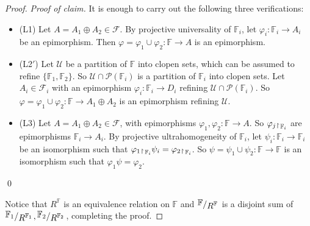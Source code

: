 \documentclass[12pt,twoside,a4paper]{amsart}
\theoremstyle{plain}
\theoremstyle{definition}
\begin{document}
\begin{proof}
{\it Proof of claim.}
It is enough to carry out the following three verifications:
\begin{itemize}
\item (L1) Let $A=A_1\oplus A_2\in \mathcal F $.
By projective universality of $ \mathbb F_i$, let $ {\varphi}_i: \mathbb F_i\to A_i$ be an epimorphism.
Then $ {\varphi} = {\varphi}_1\cup {\varphi}_2: \mathbb F \to A$ is an epimorphism.
\item (L2$'$) Let $ \mathcal U $ be a partition of $ \mathbb F $ into clopen sets, which can be assumed to refine $\{ \mathbb F_1, \mathbb F_2\} $.
So $ \mathcal U \cap \mathcal P ( \mathbb F_i)$ is a partition of $ \mathbb F_i$ into clopen sets.
Let $A_i\in \mathcal F_i$ with an epimorphism $ {\varphi}_i: \mathbb F_i\to D_i$ refining $ \mathcal U \cap \mathcal P ( \mathbb F_i)$.
So $ {\varphi} = {\varphi}_1\cup {\varphi}_2: \mathbb F \to A_1\oplus A_2$ is an epimorphism refining $ \mathcal U $.
\item (L3) Let $A=A_1\oplus A_2\in \mathcal F $, with epimorphisms $ {\varphi}_1,{\varphi}_2: \mathbb F \to A$.
So $ {\varphi}_j {\, _{{\begin{tikzpicture}[{}]\draw (0,-0.5pt) -- (0,5pt);\draw (0,5pt) -- (1.5pt,3.5pt);\end{tikzpicture}}\, { \mathbb F_i}}} $ are epimorphisms $ \mathbb F_i\to A_i$.
By projective ultrahomogeneity of $ \mathbb F_i$, let $\psi_i: \mathbb F_i\to \mathbb F_i$ be an isomorphism such that $ {\varphi}_1 {\, _{{\begin{tikzpicture}[{}]\draw (0,-0.5pt) -- (0,5pt);\draw (0,5pt) -- (1.5pt,3.5pt);\end{tikzpicture}}\, { \mathbb F_i}}} \psi_i= {\varphi}_2 {\, _{{\begin{tikzpicture}[{}]\draw (0,-0.5pt) -- (0,5pt);\draw (0,5pt) -- (1.5pt,3.5pt);\end{tikzpicture}}\, { \mathbb F_i}}} $.
So $\psi =\psi_1\cup\psi_2: \mathbb F \to \mathbb F $ is an isomorphism such that $ {\varphi}_1\psi = {\varphi}_2$.
\end{itemize}
\qed

Notice that $R^{ \mathbb F }$ is an equivalence relation on $ \mathbb F $ and $ {{\raisebox{.2em}{${\mathbb F }\!$}\left/\raisebox{-.2em}{${R^{ \mathbb F }}$}\right.}} $ is a disjoint sum of $ {{\raisebox{.2em}{${\mathbb F_1}\!$}\left/\raisebox{-.2em}{${R^{ \mathbb F_1}}$}\right.}} , {{\raisebox{.2em}{${ \mathbb F_2}\!$}\left/\raisebox{-.2em}{${R^{ \mathbb F_2}}$}\right.}}$, completing the proof.
\end{proof}
\end{document}
